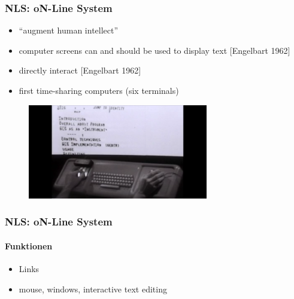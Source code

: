 \begin{frame}
\frametitle{NLS: oN-Line System}
\begin{itemize}
	\item “augment human intellect”
	\item computer screens can and should be used to display text [Engelbart 1962]
	\item directly interact [Engelbart 1962]
	\item first time-sharing computers (six terminals)
\end{itemize}

\begin{figure}[htbp]
	\centering
	\includegraphics[width=0.7\textwidth]{images/nls}
\end{figure}

\end{frame}

\begin{frame}
\frametitle{NLS: oN-Line System}
\framesubtitle{Funktionen}
\begin{itemize}

	\item Links 
	\item mouse, windows, interactive text editing
	

\end{itemize}
\end{frame}
